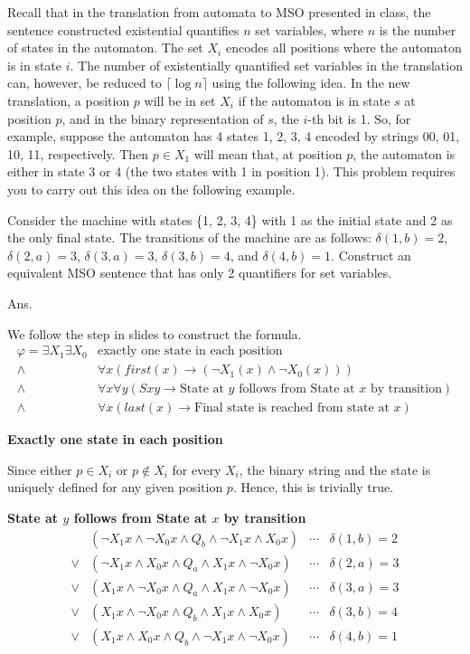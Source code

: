 \documentclass[11pt]{homework}
\begin{document}
\question
Recall that in the translation from automata to MSO presented in class,
the sentence constructed existential quantifies \(n\) set variables,
where \(n\) is the number of states in the automaton.
The set \(X_i\) encodes all positions where the automaton is in state \(i\).  
The number of existentially quantified set variables in the translation can,
however, be reduced to \(\lceil \log n \rceil\) using the following idea.
In the new translation, a position \(p\) will be in set \(X_i\)
if the automaton is in state \(s\) at position \(p\),
and in the binary representation of \(s\),
the \(i\)-th bit is 1.
So, for example, suppose the automaton has 4 states 1, 2, 3, 4 encoded by strings 00, 01, 10, 11, respectively.
Then \(p \in X_1\) will mean that, at position \(p\),
the automaton is either in state 3 or 4 (the two states with 1 in position 1).
This problem requires you to carry out this idea on the following example.

Consider the machine with states \{1, 2, 3, 4\}
with 1 as the initial state and 2 as the only final state.
The transitions of the machine are as follows:
\(\delta(1,b)=2\), \(\delta(2,a)=3\), \(\delta(3,a)=3\), \(\delta(3,b)=4\),
and \(\delta(4,b)=1\).
Construct an equivalent MSO sentence that has only 2 quantifiers for set variables.

Ans.

We follow the step in slides to construct the formula.
\[
\begin{array}{rl}
	\varphi = \exists X_1 \exists X_0
       & \text{exactly one state in each position}                \\
 \land & \forall x (first(x) \to (\neg X_1(x) \land \neg X_0(x))) \\
 \land & \forall x \forall y ( S x y \to \text{State at \(y\) follows from State at \(x\) by transition}) \\
 \land & \forall x (last(x) \to \text{Final state is reached from state at \(x\)})
\end{array}
\]

\textbf{Exactly one state in each position}

Since either \(p \in X_i\) or \(p \notin X_i\) for every \(X_i\),
the binary string and the state is uniquely defined for any given position \(p\).
Hence, this is trivially true.

\textbf{State at \(y\) follows from State at \(x\) by transition}
\[
\begin{array}{rlcl}
	     & (\neg X_1 x \land \neg X_0 x \land Q_b \land \neg X_1 x \land X_0 x) & \cdots & \delta(1,b)=2 \\
	\lor & (\neg X_1 x \land X_0 x \land Q_a \land X_1 x \land \neg X_0 x) & \cdots & \delta(2,a)=3 \\
	\lor & (X_1 x \land \neg X_0 x \land Q_a \land X_1 x \land \neg X_0 x) & \cdots & \delta(3,a)=3 \\
	\lor & (X_1 x \land \neg X_0 x \land Q_b \land X_1 x \land X_0 x) & \cdots & \delta(3,b)=4 \\
    \lor & (X_1 x \land X_0 x \land Q_b \land \neg X_1 x \land \neg X_0 x) & \cdots & \delta(4,b)=1 \\
\end{array}
\]
\end{document}
